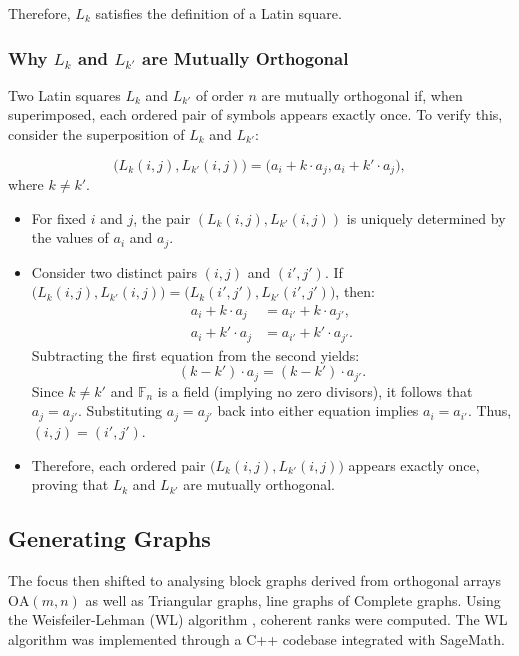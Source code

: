 \documentclass[12pt]{article}
\begin{document}
Therefore, \( L_k \) satisfies the definition of a Latin square.

\subsubsection{Why \( L_k \) and \( L_{k'} \) are Mutually Orthogonal} 

Two Latin squares \( L_k \) and \( L_{k'} \) of order \( n \) are mutually orthogonal if, when superimposed, each ordered pair of symbols appears exactly once. To verify this, consider the superposition of \( L_k \) and \( L_{k'} \):

\[
\big(L_k(i, j), L_{k'}(i, j)\big) = \big(a_i + k \cdot a_j, a_i + k' \cdot a_j\big),
\]
where \( k \neq k' \).

\begin{itemize}
    \item For fixed \( i \) and \( j \), the pair \( (L_k(i, j), L_{k'}(i, j)) \) is uniquely determined by the values of \( a_i \) and \( a_j \).
    \item Consider two distinct pairs \( (i, j) \) and \( (i', j') \). If \( \big(L_k(i, j), L_{k'}(i, j)\big) = \big(L_k(i', j'), L_{k'}(i', j')\big) \), then:
    \[
    \begin{aligned}
    a_i + k \cdot a_j &= a_{i'} + k \cdot a_{j'}, \\
    a_i + k' \cdot a_j &= a_{i'} + k' \cdot a_{j'}.
    \end{aligned}
    \]
    Subtracting the first equation from the second yields:
    \[
    (k - k') \cdot a_j = (k - k') \cdot a_{j'}.
    \]
    Since \( k \neq k' \) and \( \mathbb{F}_n \) is a field (implying no zero divisors), it follows that \( a_j = a_{j'} \). Substituting \( a_j = a_{j'} \) back into either equation implies \( a_i = a_{i'} \). Thus, \( (i, j) = (i', j') \).

    \item Therefore, each ordered pair \( \big(L_k(i, j), L_{k'}(i, j)\big) \) appears exactly once, proving that \( L_k \) and \( L_{k'} \) are mutually orthogonal.
\end{itemize}



\subsection{Generating Graphs}
The focus then shifted to analysing block graphs derived from orthogonal arrays \(\text{OA}(m, n)\) as well as Triangular graphs, line graphs of Complete graphs. Using the Weisfeiler-Lehman (WL) algorithm \cite{k-wl}, coherent ranks were computed. The WL algorithm was implemented through a C++ codebase \cite{reichard_weisfeiler} integrated with SageMath.
\end{document}
